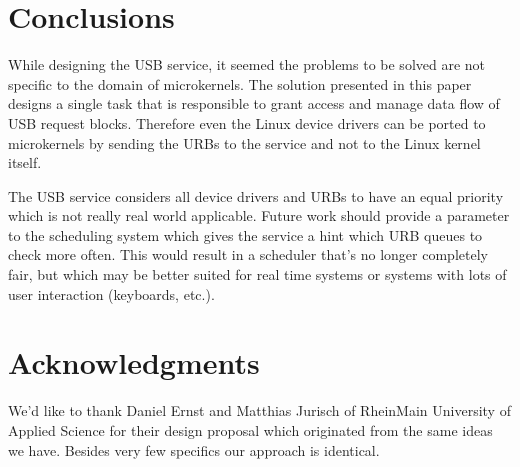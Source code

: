 \documentclass{acm_proc_article-sp}
\begin{document}
\section{Conclusions}
While designing the USB service, it seemed the problems to be
solved are not specific to the domain of microkernels.
The solution presented in this paper designs a single task
that is responsible to grant access and manage data flow
of USB request blocks.
Therefore even the Linux device drivers can be ported
to microkernels by sending the URBs to the service and not to
the Linux kernel itself.

The USB service considers all device drivers and URBs to have
an equal priority which is not really real world applicable.
Future work should provide a parameter to the scheduling system
which gives the service a hint which URB queues to check
more often.
This would result in a scheduler that's no longer completely
fair, but which may be better suited for real time systems or
systems with lots of user interaction (keyboards, etc.).

\section{Acknowledgments}
We'd like to thank Daniel Ernst and Matthias Jurisch
of RheinMain University of Applied Science for their design proposal \cite{ernst}
which originated from the same ideas we have.
Besides very few specifics our approach is identical.

%


%
%
\end{document}

